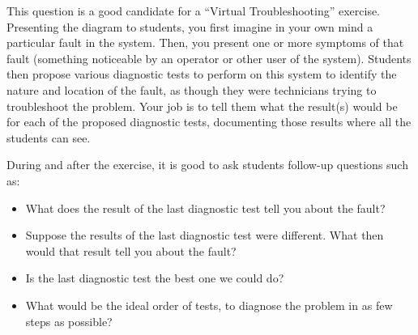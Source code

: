 This question is a good candidate for a ``Virtual Troubleshooting'' exercise.  Presenting the diagram to students, you first imagine in your own mind a particular fault in the system.  Then, you present one or more symptoms of that fault (something noticeable by an operator or other user of the system).  Students then propose various diagnostic tests to perform on this system to identify the nature and location of the fault, as though they were technicians trying to troubleshoot the problem.  Your job is to tell them what the result(s) would be for each of the proposed diagnostic tests, documenting those results where all the students can see.

During and after the exercise, it is good to ask students follow-up questions such as:

\begin{itemize}
\item{} What does the result of the last diagnostic test tell you about the fault?
\item{} Suppose the results of the last diagnostic test were different.  What then would that result tell you about the fault?
\item{} Is the last diagnostic test the best one we could do?
\item{} What would be the ideal order of tests, to diagnose the problem in as few steps as possible?
\end{itemize}



